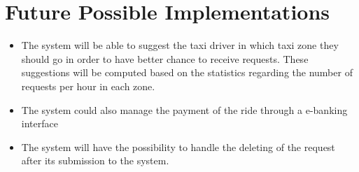 \section{Future Possible Implementations}
\begin{itemize}
	\item The system will be able to suggest the taxi driver in which taxi zone they should go in order to have better chance to receive requests. These suggestions will be computed based on the statistics regarding the number of requests per hour in each zone.
	\item The system could also manage the payment of the ride through a e-banking interface
	\item The system will have the possibility to handle the deleting of the request after its submission to the system.
\end{itemize}
